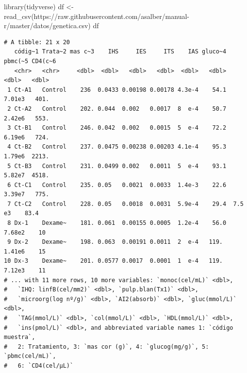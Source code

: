 \documentclass[
  a4paper,
]{scrreport}
\newenvironment{Shaded}{\begin{snugshade}}{\end{snugshade}}
\newcommand{\FunctionTok}[1]{\textcolor[rgb]{0.28,0.35,0.67}{#1}}
\newcommand{\NormalTok}[1]{\textcolor[rgb]{0.00,0.23,0.31}{#1}}
\newcommand{\OtherTok}[1]{\textcolor[rgb]{0.00,0.23,0.31}{#1}}
\newcommand{\StringTok}[1]{\textcolor[rgb]{0.13,0.47,0.30}{#1}}
\theoremstyle{definition}
\theoremstyle{definition}
\theoremstyle{remark}
\begin{document}
\begin{tcolorbox}[enhanced jigsaw, colbacktitle=quarto-callout-note-color!10!white, breakable, opacitybacktitle=0.6, left=2mm, opacityback=0, leftrule=.75mm, colframe=quarto-callout-note-color-frame, bottomrule=.15mm, toprule=.15mm, toptitle=1mm, colback=white, titlerule=0mm, title=\textcolor{quarto-callout-note-color}{\faInfo}\hspace{0.5em}{Solución}, rightrule=.15mm, arc=.35mm, bottomtitle=1mm, coltitle=black]

\begin{Shaded}
\begin{Highlighting}[]
\FunctionTok{library}\NormalTok{(tidyverse)}
\NormalTok{df }\OtherTok{\textless{}{-}} \FunctionTok{read\_csv}\NormalTok{(}\StringTok{\textquotesingle{}https://raw.githubusercontent.com/asalber/manual{-}r/master/datos/genetica.csv\textquotesingle{}}\NormalTok{)}
\NormalTok{df}
\end{Highlighting}
\end{Shaded}

\begin{verbatim}
# A tibble: 21 x 20
   códig~1 Trata~2 mas c~3    IHS     IES     ITS    IAS gluco~4 pbmc(~5 CD4(c~6
   <chr>   <chr>     <dbl>  <dbl>   <dbl>   <dbl>  <dbl>   <dbl>   <dbl>   <dbl>
 1 Ct-A1   Control    236  0.0433 0.00198 0.00178 4.3e-4    54.1  7.01e3   401. 
 2 Ct-A2   Control    202. 0.044  0.002   0.0017  8  e-4    50.7  2.42e6   553. 
 3 Ct-B1   Control    246. 0.042  0.002   0.0015  5  e-4    72.2  6.19e6   724. 
 4 Ct-B2   Control    237. 0.0475 0.00238 0.00203 4.1e-4    95.3  1.79e6  2213. 
 5 Ct-B3   Control    231. 0.0499 0.002   0.0011  5  e-4    93.1  5.82e7  4518. 
 6 Ct-C1   Control    235. 0.05   0.0021  0.0033  1.4e-3    22.6  3.39e7   775. 
 7 Ct-C2   Control    228. 0.05   0.0018  0.0031  5.9e-4    29.4  7.5 e3    83.4
 8 Dx-1    Dexame~    181. 0.061  0.00155 0.0005  1.2e-4    56.0  7.68e2    10  
 9 Dx-2    Dexame~    198. 0.063  0.00191 0.0011  2  e-4   119.   1.41e6    15  
10 Dx-3    Dexame~    201. 0.0577 0.0017  0.0001  1  e-4   119.   7.12e3    11  
# ... with 11 more rows, 10 more variables: `monoc(cel/mL)` <dbl>,
#   `IHQ: linfB(cel/mm2)` <dbl>, `pulp.blan(Tx1)` <dbl>,
#   `microorg(log nº/g)` <dbl>, `AI2(absorb)` <dbl>, `gluc(mmol/L)` <dbl>,
#   `TAG(mmol/L)` <dbl>, `col(mmol/L)` <dbl>, `HDL(mmol/L)` <dbl>,
#   `ins(pmol/L)` <dbl>, and abbreviated variable names 1: `código muestra`,
#   2: Tratamiento, 3: `mas cor (g)`, 4: `glucog(mg/g)`, 5: `pbmc(cel/mL)`,
#   6: `CD4(cel/µL)`
\end{verbatim}

\end{tcolorbox}
\end{document}
